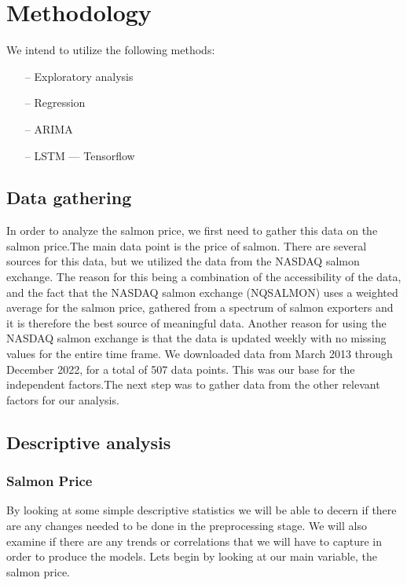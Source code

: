 \section{Methodology}\label{sec:methodology}

We intend to utilize the following methods:
\begin{itemize}
    \item[--] Exploratory analysis
    \item[--] Regression
    \item[--] ARIMA
    \item[--] LSTM --- Tensorflow
    \end{itemize}

\subsection{Data gathering}
In order to analyze the salmon price, we first need to gather this data on the salmon price.The main data point is the price of salmon. There are several sources for this data, but we utilized the data from the NASDAQ salmon exchange. The reason for this being a combination of the accessibility of the data, and the fact that the NASDAQ salmon exchange (NQSALMON) uses a weighted average for the salmon price, gathered from a spectrum of salmon exporters and it is therefore the best source of meaningful data. Another reason for using the NASDAQ salmon exchange is that the data is updated weekly with no missing values for the entire time frame. We downloaded data from March 2013 through December 2022, for a total of 507 data points. This was our base for the independent factors.The next step was to gather data from the other relevant factors for our analysis.

\subsection{Descriptive analysis}
\subsubsection{Salmon Price}\label{Salmon Price}
By looking at some simple descriptive statistics we will be able to decern if there are any changes needed to be done in the preprocessing stage. We will also examine if there are any trends or correlations that we will have to capture in order to produce the models. Lets begin by looking at our main variable, the salmon price.

